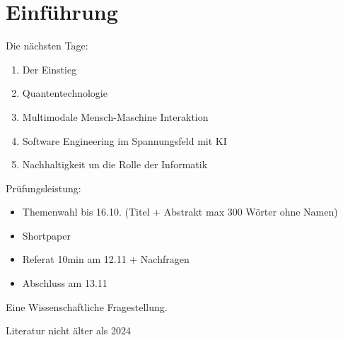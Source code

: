 \documentclass[a4paper]{article}
\title{\docTitle}
\author{Moritz}
\date{\today}
\begin{document}
\maketitle
\tableofcontents


\section{Einführung}

Die nächsten Tage:

\begin{enumerate}
    \item Der Einstieg
    \item Quantentechnologie
    \item Multimodale Mensch-Maschine Interaktion
    \item Software Engineering im Spannungsfeld mit KI
    \item Nachhaltigkeit un die Rolle der Informatik
\end{enumerate}

Prüfungsleistung:

\begin{itemize}
    \item Themenwahl bis 16.10. (Titel + Abstrakt max 300 Wörter ohne Namen)
    \item Shortpaper
    \item Referat 10min am 12.11 + Nachfragen
    \item Abschluss am 13.11
\end{itemize}

Eine Wissenschaftliche Fragestellung.

Literatur nicht älter als 2024
\end{document}
